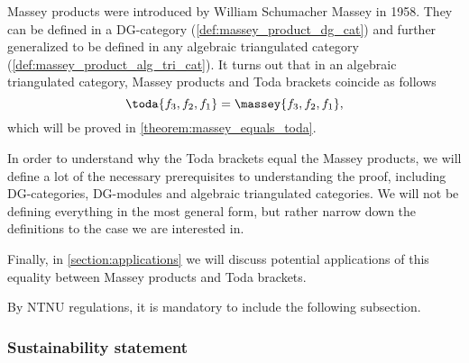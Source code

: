 Massey products were introduced by William Schumacher Massey in 1958. They can be defined in a DG-category (\autoref{def:massey_product_dg_cat}) and further generalized to be defined in any algebraic triangulated category (\autoref{def:massey_product_alg_tri_cat}). It turns out that in an algebraic triangulated category, Massey products and Toda brackets coincide as follows
\[
    \toda{f_3, f_2, f_1} = \massey{f_3, f_2, f_1},
\]
which will be proved in \autoref{theorem:massey_equals_toda}.

In order to understand why the Toda brackets equal the Massey products, we will define a lot of the necessary prerequisites to understanding the proof, including DG-categories, DG-modules and algebraic triangulated categories. We will not be defining everything in the most general form, but rather narrow down the definitions to the case we are interested in.

Finally, in \autoref{section:applications} we will discuss potential applications of this equality between Massey products and Toda brackets.

By NTNU regulations, it is mandatory to include the following subsection.
\subsubsection{Sustainability statement}

